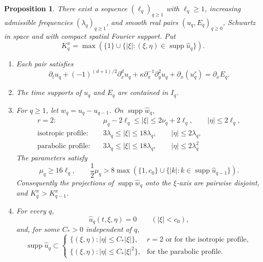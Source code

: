 \documentclass[12pt,reqno,letterpaper]{amsart}
\numberwithin{equation}{section}
\newtheorem{proposition}[theorem]{Proposition}
\theoremstyle{definition}
\newcommand{\la}{\lambda}
\newcommand{\supp}{\operatorname{supp}}
\newcommand{\abs}[1]{\left\lvert #1\right\rvert}
\begin{document}
\begin{proposition}\label{prop:Euclidean-induction}
There exist a sequence $(\ell_q)_{q\geq1}$ with $\ell_q\geq1$,
increasing admissible frequencies $(\la_q)_{q\geq1}$, and smooth real
pairs $(u_q,E_q)_{q\geq0}$, Schwartz in space and with
compact spatial Fourier support.  Put
\[
 K_q^x=\max\left(\{1\}\cup
 \{\abs\xi:(\xi,\eta)\in\supp\widehat u_q\}\right).
\]
\begin{enumerate}[label=\textup{(\roman*)}]
 \item Each pair satisfies
 \begin{equation}\label{eq:Euclidean-induction-indexed-relaxed}
  \partial_tu_q+(-1)^{(d+1)/2}\partial_x^du_q
  +\kappa\partial_x^{-1}\partial_y^2u_q+\partial_x(u_q^r)
  =\partial_xE_q.
 \end{equation}

 \item The time supports of $u_q$ and $E_q$ are contained in $I_q$.

 \item For $q\geq1$, let $w_q=u_q-u_{q-1}$.  On
 $\supp\widehat w_q$,
 \begin{equation*}
 \begin{aligned}
  r=2:&\quad \mu_q-2\ell_q\leq\abs\xi
       \leq2\nu_q+2\ell_q,
       \qquad \abs\eta\leq2\ell_q,\\
 \text{isotropic profile}:&\quad
       3\la_q\leq\abs\xi\leq18\la_q,
       \qquad \abs\eta\leq2\la_q,\\
 \text{parabolic profile}:&\quad
       3\la_q\leq\abs\xi\leq18\la_q,
       \qquad \abs\eta\leq2\la_q^2
 \end{aligned}
 \end{equation*}
 The parameters satisfy
 \begin{equation*}
  \mu_q\geq16\ell_q,\qquad
  \frac12\mu_q>
  8\max\left(\{1,c_0\}\cup
  \{\abs k:k\in\supp\widehat u_{q-1}\}\right).
 \end{equation*}
 Consequently the projections of $\supp\widehat w_q$ onto the $\xi$-axis
 are pairwise disjoint, and $K_q^x>K_{q-1}^x$.

 \item For every $q$,
 \begin{equation*}
  \widehat u_q(t,\xi,\eta)=0\qquad(\abs\xi<c_0),
 \end{equation*}
 and, for some $C_*>0$ independent of $q$,
 \begin{equation}\label{eq:Euclidean-induction-cone}
  \supp\widehat u_q\subset
  \begin{cases}
   \{(\xi,\eta):\abs\eta\leq C_*\abs\xi\},
      &r=2\text{ or for the isotropic profile},\\
   \{(\xi,\eta):\abs\eta\leq C_*\abs\xi^2\},
      &\text{for the parabolic profile}.
  \end{cases}
 \end{equation}


\end{enumerate}
\end{proposition}
\end{document}
